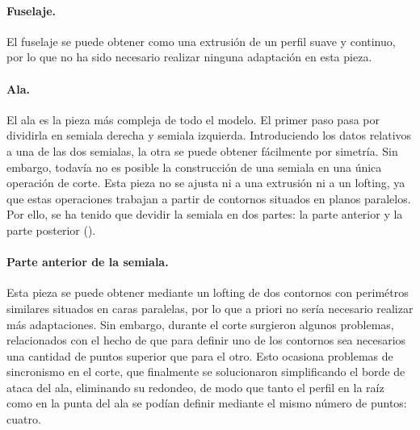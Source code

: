 \paragraph{Fuselaje.} El fuselaje se puede obtener como una extrusión de un perfil suave y continuo, por lo que no ha sido necesario realizar ninguna adaptación en esta pieza.

\paragraph{Ala.} El ala es la pieza más compleja de todo el modelo. El primer paso pasa por dividirla en semiala derecha y semiala izquierda. Introduciendo los datos relativos a una de las dos semialas, la otra se puede obtener fácilmente por simetría. Sin embargo, todavía no es posible la construcción de una semiala en una única operación de corte. Esta pieza no se ajusta ni a una extrusión ni a un lofting, ya que estas operaciones trabajan a partir de contornos situados en planos paralelos. Por ello, se ha tenido que devidir la semiala en dos partes: la parte anterior y la parte posterior ().

\paragraph{Parte anterior de la semiala.} Esta pieza se puede obtener mediante un lofting de dos contornos con perimétros similares situados en caras paralelas, por lo que a priori no sería necesario realizar más adaptaciones. Sin embargo, durante el corte surgieron algunos problemas, relacionados con el hecho de que para definir uno de los contornos sea necesarios una cantidad de puntos superior que para el otro. Esto ocasiona problemas de sincronismo en el corte, que finalmente se solucionaron simplificando el borde de ataca del ala, eliminando su redondeo, de modo que tanto el perfil en la raíz como en la punta del ala se podían definir mediante el mismo número de puntos: cuatro.

